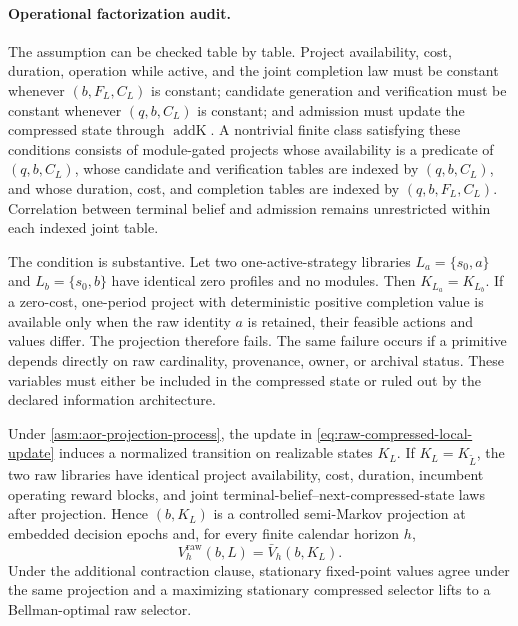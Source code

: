 \paragraph{Operational factorization audit.}
The assumption can be checked table by table. Project availability, cost,
duration, operation while active, and the joint completion law must be constant
whenever \((b,F_L,C_L)\) is constant; candidate generation and verification
must be constant whenever \((q,b,C_L)\) is constant; and admission must update
the compressed state through \(\operatorname{addK}\). A nontrivial finite class
satisfying these conditions consists of module-gated projects whose
availability is a predicate of \((q,b,C_L)\), whose candidate and verification
tables are indexed by \((q,b,C_L)\), and whose duration, cost, and completion
tables are indexed by \((q,b,F_L,C_L)\). Correlation between terminal belief
and admission remains unrestricted within each indexed joint table.

The condition is substantive. Let two one-active-strategy libraries
\(L_a=\{s_0,a\}\) and \(L_b=\{s_0,b\}\) have identical zero profiles and no
modules. Then \(K_{L_a}=K_{L_b}\). If a zero-cost, one-period project with
deterministic positive completion value is available only when the raw identity
\(a\) is retained, their feasible actions and values differ. The projection
therefore fails. The same failure occurs if a primitive depends directly on
raw cardinality, provenance, owner, or archival status. These variables must
either be included in the compressed state or ruled out by the declared
information architecture.

\begin{theorem}
\label{thm:raw-to-compressed-projection}
Under \cref{asm:aor-projection-process}, the update in
\eqref{eq:raw-compressed-local-update} induces a normalized transition on
realizable states \(K_L\).  If \(K_L=K_{\widetilde L}\), the two raw libraries
have identical project availability, cost, duration, incumbent operating
reward blocks, and joint terminal-belief--next-compressed-state laws after
projection.  Hence \((b,K_L)\) is a controlled semi-Markov projection at
embedded decision epochs and, for every finite calendar horizon \(h\),
\[
  V_h^{\mathrm{raw}}(b,L)=\bar V_h(b,K_L).
\]
Under the additional contraction clause, stationary fixed-point values agree
under the same projection and a maximizing stationary compressed selector
lifts to a Bellman-optimal raw selector.
\end{theorem}

